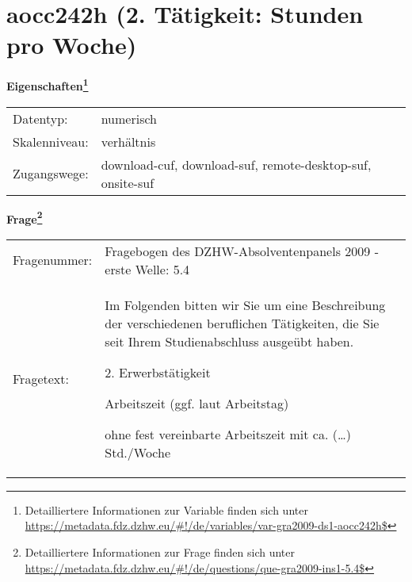 
    \setcounter{footnote}{0}

    \vspace*{-1.8cm}
	\section{aocc242h (2. Tätigkeit: Stunden pro Woche)}
	\label{section:aocc242h}



    \vspace*{0.5cm}
    \noindent\textbf{Eigenschaften\footnote{Detailliertere Informationen zur Variable finden sich unter
		\url{https://metadata.fdz.dzhw.eu/\#!/de/variables/var-gra2009-ds1-aocc242h$}}}\\
	\begin{tabularx}{\hsize}{@{}lX}
	Datentyp: & numerisch \\
	Skalenniveau: & verhältnis \\
	Zugangswege: &
	  download-cuf, 
	  download-suf, 
	  remote-desktop-suf, 
	  onsite-suf
 \\
    \end{tabularx}



				\vspace*{0.5cm}
                \noindent\textbf{Frage\footnote{Detailliertere Informationen zur Frage finden sich unter
		              \url{https://metadata.fdz.dzhw.eu/\#!/de/questions/que-gra2009-ins1-5.4$}}}\\
				\begin{tabularx}{\hsize}{@{}lX}
					Fragenummer: &
					  Fragebogen des DZHW-Absolventenpanels 2009 - erste Welle:
					  5.4
 \\
					Fragetext: & Im Folgenden bitten wir Sie um eine Beschreibung der verschiedenen beruflichen Tätigkeiten, die Sie seit Ihrem Studienabschluss ausgeübt haben.\par  2. Erwerbstätigkeit\par  Arbeitszeit (ggf. laut Arbeitstag)\par  ohne fest vereinbarte Arbeitszeit mit ca. (…) Std./Woche \\
				\end{tabularx}





